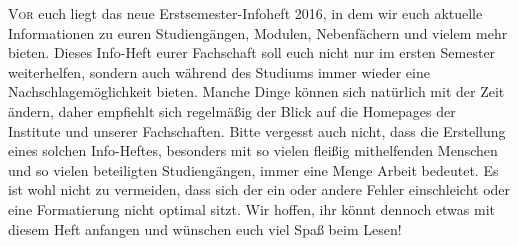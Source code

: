 
\thispagestyle{plain}
\lettrine[lines=3,loversize=0.2,slope=-15,lhang=0.2]{V}{or} euch liegt das neue Erstsemester-Infoheft 2016, in dem wir euch aktuelle Informationen zu euren Studiengängen, Modulen, Nebenfächern und vielem mehr bieten. Dieses Info-Heft eurer Fachschaft soll euch nicht nur im ersten Semester weiterhelfen, sondern auch während des Studiums immer wieder eine Nachschlagemöglichkeit bieten. Manche Dinge können sich natürlich mit der Zeit ändern, daher empfiehlt sich regelmäßig der Blick auf die Homepages der Institute und unserer Fachschaften. Bitte vergesst auch nicht, dass die Erstellung eines solchen Info-Heftes, besonders mit so vielen fleißig mithelfenden Menschen und so vielen beteiligten Studiengängen, immer eine Menge Arbeit bedeutet. Es ist wohl nicht zu vermeiden, dass sich der ein oder andere Fehler einschleicht oder eine Formatierung nicht optimal sitzt. Wir hoffen, ihr könnt dennoch etwas mit diesem Heft anfangen und wünschen euch viel Spaß beim Lesen!

